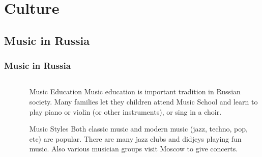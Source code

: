 \documentclass[pdflatex,compress,8pt,
	xcolor={dvipsnames,dvipsnames,svgnames,x11names,table},
	hyperref={colorlinks = true,breaklinks = true, urlcolor = NavyBlue, breaklinks = true}]{beamer}
\begin{document}
\section{Culture}
\subsection{Music in Russia}
\begin{frame}\frametitle{Music in Russia}
\begin{minipage}[0.4\textheight]{\textwidth}
\begin{columns}[T]
\begin{column}{0.4\textwidth}
\begin{figure}[H]
	\centering
			\vspace{5mm}
\end{figure}
\end{column}
\begin{column}{0.6\textwidth}
\vspace{2em} 
\begin{alertblock}{Music Education}
Music education is important tradition in Russian society. 
Many families let they children attend Music School and learn to play piano or violin (or other instruments), or sing  in a choir.   
\end{alertblock}

\begin{block}{Music Styles}
Both classic music and modern music (jazz, techno, pop, etc) are popular. 
There are many jazz clubs and didjeys playing fun music. 
Also various musician groups visit Moscow to give concerts.
\end{block}
\end{column}
\end{columns}
\end{minipage}
\end{frame}
\end{document}

